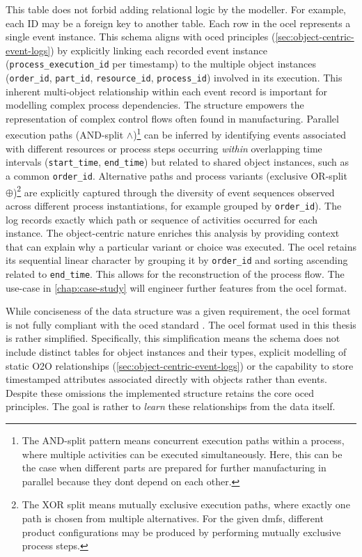 This table does not forbid adding relational logic by the modeller. For example, each ID may be a foreign key to another table. Each row in the \gls{ocel} represents a single event instance. This schema aligns with \gls{oced} principles (\autoref{sec:object-centric-event-logs}) by explicitly linking each recorded event instance (\texttt{process\_execution\_id} per timestamp) to the multiple object instances (\texttt{order\_id}, \texttt{part\_id}, \texttt{resource\_id}, \texttt{process\_id}) involved in its execution. This inherent multi-object relationship within each event record is important for modelling complex process dependencies. The structure empowers the representation of complex control flows often found in manufacturing. Parallel execution paths (AND-split $\wedge$)\footnote{The AND-split pattern means concurrent execution paths within a process, where multiple activities can be executed simultaneously. Here, this can be the case when different parts are prepared for further manufacturing in parallel because they dont depend on each other.} can be inferred by identifying events associated with different resources or process steps occurring \textit{within} overlapping time intervals (\texttt{start\_time}, \texttt{end\_time}) but related to shared object instances, such as a common \texttt{order\_id}. Alternative paths and process variants (exclusive OR-split $\oplus$)\footnote{The XOR split means mutually exclusive execution paths, where exactly one path is chosen from multiple alternatives. For the given \gls{dmfs}, different product configurations may be produced by performing mutually exclusive process steps.} are explicitly captured through the diversity of event sequences observed across different process instantiations, for example grouped by \texttt{order\_id}). The log records exactly which path or sequence of activities occurred for each instance. The object-centric nature enriches this analysis by providing context that can explain why a particular variant or choice was executed. The \gls{ocel} retains its sequential linear character by grouping it by \texttt{order\_id} and sorting ascending related to \texttt{end\_time}. This allows for the reconstruction of the process flow. The use-case in \autoref{chap:case-study} will engineer further features from the \gls{ocel} format.

While conciseness of the data structure was a given requirement, the \gls{ocel} format is not fully compliant with the \gls{oced} standard \autocite{van2023object}. The \gls{ocel} format used in this thesis is rather simplified. Specifically, this simplification means the schema does not include distinct tables for object instances and their types, explicit modelling of static O2O relationships (\autoref{sec:object-centric-event-logs}) or the capability to store timestamped attributes associated directly with objects rather than events. Despite these omissions the implemented structure retains the core \gls{oced} principles. The goal is rather to \textit{learn} these relationships from the data itself.

